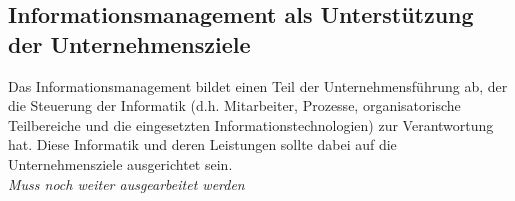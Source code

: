 \subsection{Informationsmanagement als Unterstützung der Unternehmensziele}
Das Informationsmanagement bildet einen Teil der Unternehmensführung ab, der die Steuerung der Informatik (d.h. Mitarbeiter, Prozesse, organisatorische Teilbereiche und die eingesetzten Informationstechnologien) zur Verantwortung hat. Diese Informatik und deren Leistungen sollte dabei auf die Unternehmensziele ausgerichtet sein.\\

\emph{Muss noch weiter ausgearbeitet werden}
